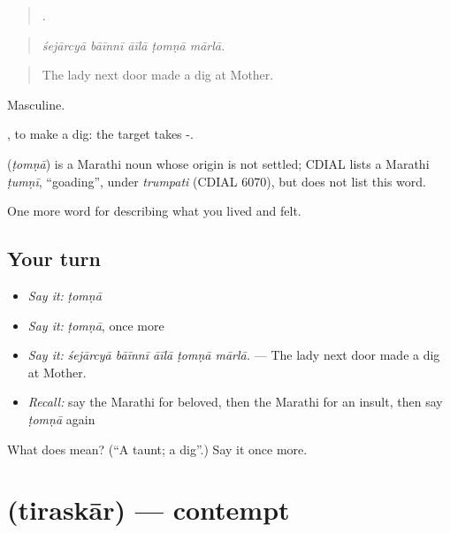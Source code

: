 \begin{quote}
    .
\end{quote}

\begin{quote}
\emph{śejārcyā bāīnnī āīlā ṭomṇā mārlā.}
\end{quote}

\begin{quote}
The lady next door made a dig at Mother.
\end{quote}

Masculine.

 , to make a dig: the target takes -.

\begin{cousinweb}
\textbf{} (\emph{ṭomṇā}) is a Marathi noun whose origin is not settled; CDIAL lists a Marathi \emph{ṭumṇī}, \textquotedblleft{}goading\textquotedblright{}, under \emph{trumpati} (CDIAL 6070), but does not list this word.
\end{cousinweb}

\begin{grammarlens}[title={What you've built}]
One more word for describing what you lived and felt.
\end{grammarlens}

\subsection*{Your turn}
\begin{itemize}
\raggedright
  \item \emph{Say it:} \emph{ṭomṇā}
  \item \emph{Say it:} \emph{ṭomṇā}, once more
  \item \emph{Say it:} \emph{śejārcyā bāīnnī āīlā ṭomṇā mārlā.} — The lady next door made a dig at Mother.
  \item \emph{Recall:} say the Marathi for beloved, then the Marathi for an insult, then say \emph{ṭomṇā} again
\end{itemize}

\begin{tcolorbox}[breakable,colback=teal!4,colframe=teal!35!black,title={Before you move on}]
What does  mean? (\textquotedblleft{}A taunt; a dig\textquotedblright{}.) Say it once more.
\end{tcolorbox}
\section[\texorpdfstring{\mr{तिरस्कार} (tiraskār)}{तिरस्कार (tiraskār)}]{ (tiraskār) — contempt}


